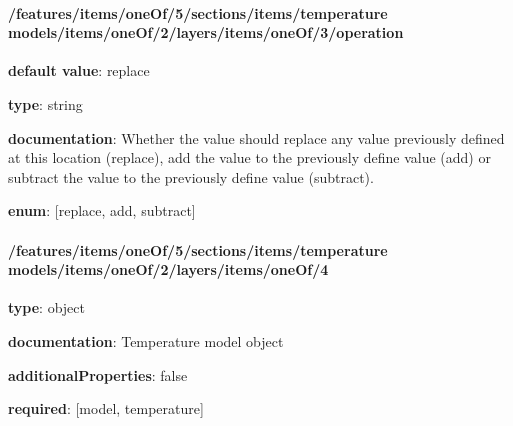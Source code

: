\begin{itemized}
\end{itemized}\paragraph{/features/items/oneOf/5/sections/items/temperature models/items/oneOf/2/layers/items/oneOf/3/operation} \begin{itemized}
\item {\bf default value}: replace
\item {\bf type}: string
\item {\bf documentation}: Whether the value should replace any value previously defined at this location (replace), add the value to the previously define value (add) or subtract the value to the previously define value (subtract).
\item {\bf enum}: [replace, add, subtract]\end{itemized}\paragraph{/features/items/oneOf/5/sections/items/temperature models/items/oneOf/2/layers/items/oneOf/4} \begin{itemized}
\item {\bf type}: object
\item {\bf documentation}: Temperature model object
\item {\bf additionalProperties}: false
\item {\bf required}: [model, temperature]\end{itemized}
